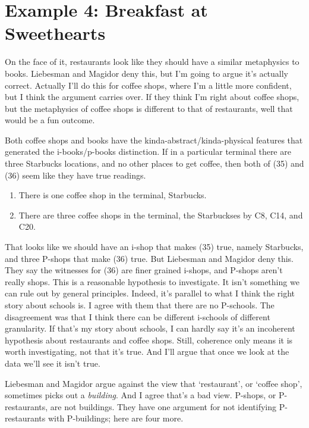 \documentclass[
  11pt,
  letterpaper,
  DIV=11,
  numbers=noendperiod,
  twoside]{scrartcl}
\providecommand{\tightlist}{%
  \setlength{\itemsep}{0pt}\setlength{\parskip}{0pt}}
\begin{document}
\section{Example 4: Breakfast at
Sweethearts}\label{example-4-breakfast-at-sweethearts}

On the face of it, restaurants look like they should have a similar
metaphysics to books. Liebesman and Magidor deny this, but I'm going to
argue it's actually correct. Actually I'll do this for coffee shops,
where I'm a little more confident, but I think the argument carries
over. If they think I'm right about coffee shops, but the metaphysics of
coffee shops is different to that of restaurants, well that would be a
fun outcome.

Both coffee shops and books have the kinda-abstract/kinda-physical
features that generated the i-books/p-books distinction. If in a
particular terminal there are three Starbucks locations, and no other
places to get coffee, then both of (35) and (36) seem like they have
true readings.

\begin{enumerate}
\def\labelenumi{(\arabic{enumi})}
\setcounter{enumi}{34}
\tightlist
\item
  There is one coffee shop in the terminal, Starbucks.
\item
  There are three coffee shops in the terminal, the Starbuckses by C8,
  C14, and C20.
\end{enumerate}

That looks like we should have an i-shop that makes (35) true, namely
Starbucks, and three P-shops that make (36) true. But Liebesman and
Magidor deny this. They say the witnesses for (36) are finer grained
i-shops, and P-shops aren't really shops. This is a reasonable
hypothesis to investigate. It isn't something we can rule out by general
principles. Indeed, it's parallel to what I think the right story about
schools is. I agree with them that there are no P-schools. The
disagreement was that I think there can be different i-schools of
different granularity. If that's my story about schools, I can hardly
say it's an incoherent hypothesis about restaurants and coffee shops.
Still, coherence only means it is worth investigating, not that it's
true. And I'll argue that once we look at the data we'll see it isn't
true.

Liebesman and Magidor argue against the view that `restaurant', or
`coffee shop', sometimes picks out a \emph{building}. And I agree that's
a bad view. P-shops, or P-restaurants, are not buildings. They have one
argument for not identifying P-restaurants with P-buildings; here are
four more.
\end{document}
